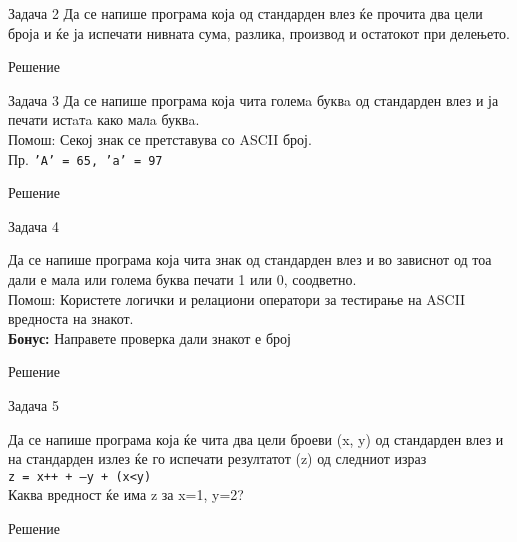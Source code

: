 \begin{frame}[fragile]{Задача 2}
Да се напише програма која од стандарден влез ќе прочита два цели броја и ќе ја
испечати нивната сума, разлика, производ и остатокот при делењето.
	\begin{exampleblock}{Решение}
		
	\end{exampleblock}
\end{frame}

\begin{frame}[fragile]{Задача 3}
Да се напише програма која чита големa буквa од стандарден влез и ја печати
истaтa како малa буквa.\\ Помош: Секој знак се претставува со ASCII број.\\
Пр. \texttt{'А' = 65, 'а' = 97}
	\begin{exampleblock}{Решение}
		
	\end{exampleblock}
\end{frame}

\begin{frame}[fragile]{Задача 4}
\begin{scriptsize}
Да се напише програма која чита знак од стандарден влез и во зависнот од тоа
дали е мала или голема буква печати 1 или 0, соодветно.\\ Помош: Користете
логички и релациони оператори за тестирање на ASCII вредноста на знакот.\\ 
\textbf{Бонус:} Направете проверка дали знакот е број	
\end{scriptsize}
\begin{exampleblock}{Решение}
			
\end{exampleblock}
\end{frame}

\begin{frame}[fragile]{Задача 5}
\begin{scriptsize}
Да се напише програма која ќе чита два цели броеви (x, y) од стандарден влез и
на стандарден излез ќе го испечати резултатот (z) од следниот израз\\ \texttt{z
= x++ + ---y + (x<y)}\\ Каква вредност ќе има z за x=1, y=2?
\end{scriptsize}
	\begin{exampleblock}{Решение}
		
	\end{exampleblock}
\end{frame}


